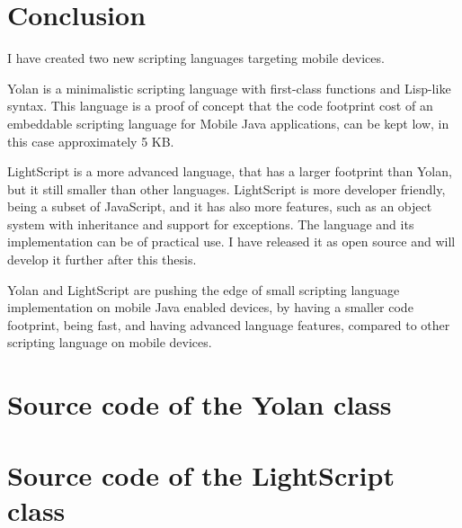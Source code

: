 \documentclass[11pt]{report}
\begin{document}
\chapter{Conclusion}
\label{conclusion}
I have created two new scripting languages targeting mobile devices.

Yolan is a minimalistic scripting language with first-class functions and Lisp-like syntax. This language is a proof of concept that the code footprint cost of an embeddable scripting language for Mobile Java applications, can be kept low, in this case approximately 5 KB.

LightScript is a more advanced language, that has a larger footprint than Yolan, but it still smaller than other languages. LightScript is more developer friendly, being a subset of JavaScript, and it has also more features, such as an object system with inheritance and support for exceptions.
The language and its implementation can be of practical use. I have released it as open source and will develop it further after this thesis.

Yolan and LightScript are pushing the edge of small scripting language implementation on mobile Java enabled devices, by having a smaller code footprint, being fast, and having advanced language features, compared to other scripting language on mobile devices.


%
%

\newpage
{}



\appendix

%


\chapter{Source code of the Yolan class}


\chapter{Source code of the LightScript class}



\newpage
{}
\printindex
\end{document}
